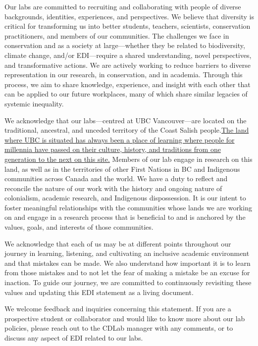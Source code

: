\documentclass[
]{book}
\begin{document}
Our labs are committed to recruiting and collaborating with people of diverse backgrounds, identities, experiences, and perspectives. We believe that diversity is critical for transforming us into better students, teachers, scientists, conservation practitioners, and members of our communities. The challenges we face in conservation and as a society at large---whether they be related to biodiversity, climate change, and/or EDI---require a shared understanding, novel perspectives, and transformative actions. We are actively working to reduce barriers to diverse representation in our research, in conservation, and in academia. Through this process, we aim to share knowledge, experience, and insight with each other that can be applied to our future workplaces, many of which share similar legacies of systemic inequality.

We acknowledge that our labs---centred at UBC Vancouver---are located on the traditional, ancestral, and unceded territory of the Coast Salish people.\href{https://indigenous.ubc.ca/indigenous-engagement/musqueam-and-ubc/}{The land where UBC is situated has always been a place of learning where people for millennia have passed on their culture, history, and traditions from one generation to the next on this site.} Members of our lab engage in research on this land, as well as in the territories of other First Nations in BC and Indigenous communities across Canada and the world. We have a duty to reflect and reconcile the nature of our work with the history and ongoing nature of colonialism, academic research, and Indigenous dispossession. It is our intent to foster meaningful relationships with the communities whose lands we are working on and engage in a research process that is beneficial to and is anchored by the values, goals, and interests of those communities.

We acknowledge that each of us may be at different points throughout our journey in learning, listening, and cultivating an inclusive academic environment and that mistakes can be made. We also understand how important it is to learn from those mistakes and to not let the fear of making a mistake be an excuse for inaction. To guide our journey, we are committed to continuously revisiting these values and updating this EDI statement as a living document.

We welcome feedback and inquiries concerning this statement. If you are a prospective student or collaborator and would like to know more about our lab policies, please reach out to the CDLab manager with any comments, or to discuss any aspect of EDI related to our labs.
\end{document}

